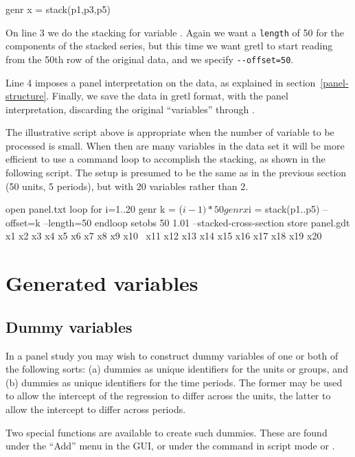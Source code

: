\begin{code}
    genr x = stack(p1,p3,p5)
\end{code}

On line 3 we do the stacking for variable .  Again we want
a \texttt{length} of 50 for the components of the stacked series, but
this time we want gretl to start reading from the 50th row of the
original data, and we specify \verb+--offset=50+.

Line 4 imposes a panel interpretation on the data, as explained in
section~\ref{panel-structure}.  Finally, we save the data in gretl
format, with the panel interpretation, discarding the original
``variables''  through .

The illustrative script above is appropriate when the number of
variable to be processed is small.  When then are many variables in
the data set it will be more efficient to use a command loop to
accomplish the stacking, as shown in the following script.  The setup
is presumed to be the same as in the previous section (50 units, 5
periods), but with 20 variables rather than 2.

\begin{code}
    open panel.txt
    loop for i=1..20
      genr k = ($i - 1) * 50
      genr x$i = stack(p1..p5) --offset=k --length=50
    endloop
    setobs 50 1.01 --stacked-cross-section
    store panel.gdt x1 x2 x3 x4 x5 x6 x7 x8 x9 x10 \
      x11 x12 x13 x14 x15 x16 x17 x18 x19 x20
\end{code}

\section{Generated variables}
\label{panel-genr}

\subsection{Dummy variables}
\label{dummies}

In a panel study you may wish to construct dummy variables of one or
both of the following sorts: (a) dummies as unique identifiers for the
units or groups, and (b) dummies as unique identifiers for the time
periods.  The former may be used to allow the intercept of the
regression to differ across the units, the latter to allow the
intercept to differ across periods.

Two special functions are available to create such dummies.  These are
found under the ``Add'' menu in the GUI, or under the \cmd{genr}
command in script mode or \app{gretlcli}.

